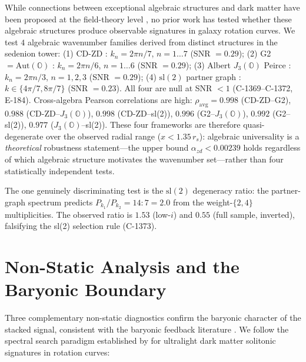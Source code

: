 \documentclass[aa]{aa}
\begin{document}
While connections between exceptional algebraic structures and dark matter have
been proposed at the field-theory level \citep{chanyal2015,masi2021}, no prior
work has tested whether these algebraic structures produce observable signatures
in galaxy rotation curves. We test $4$ algebraic wavenumber families derived from
distinct structures in the sedenion tower:
(1) CD-ZD \citep{demarrais2000,cawagas2009}: $k_n = 2\pi n/7$, $n=1\ldots 7$
(SNR $= 0.29$);
(2) G2 $= \mathrm{Aut}(\mathbb{O})$ \citep{baez2002,gresnigt2021}:
$k_n = 2\pi n/6$, $n=1\ldots 6$ (SNR $= 0.29$);
(3) Albert $J_3(\mathbb{O})$ Peirce \citep{baez2002,mccrimmon2004}:
$k_n = 2\pi n/3$, $n=1,2,3$ (SNR $= 0.29$);
(4) $\mathrm{sl}(2)$ partner graph \citep{reggiani2024}: $k \in \{4\pi/7, 8\pi/7\}$
(SNR $= 0.23$).
All four are null at SNR $< 1$ (C-1369--C-1372, E-184). Cross-algebra
Pearson correlations are high: $\rho_\mathrm{avg} = 0.998$ (CD-ZD--G2),
$0.988$ (CD-ZD--$J_3(\mathbb{O})$), $0.998$ (CD-ZD--sl(2)), $0.996$
(G2--$J_3(\mathbb{O})$), $0.992$ (G2--sl(2)), $0.977$
($J_3(\mathbb{O})$--sl(2)). These four frameworks are therefore
quasi-degenerate over the observed radial range ($x < 1.35\,r_s$):
algebraic universality is a \emph{theoretical} robustness statement---the
upper bound $\alpha_{zd} < 0.00239$ holds regardless of which algebraic
structure motivates the wavenumber set---rather than four statistically
independent tests.

The one genuinely discriminating test is the $\mathrm{sl}(2)$ degeneracy
ratio: the partner-graph spectrum predicts $P_{k_1}/P_{k_2} = 14:7 = 2.0$
from the weight-$\{2, 4\}$ multiplicities. The observed ratio is $1.53$
(low-$i$) and $0.55$ (full sample, inverted), falsifying the sl(2)
selection rule (C-1373).

\section{Non-Static Analysis and the Baryonic Boundary}
\label{sec:nonstatic}

Three complementary non-static diagnostics confirm the baryonic character
of the stacked signal, consistent with the baryonic feedback literature
\citep{dicintio2014,read2016}. We follow the spectral search paradigm
established by \citet{bar2018,bar2022} for ultralight dark matter solitonic
signatures in rotation curves:
\end{document}
